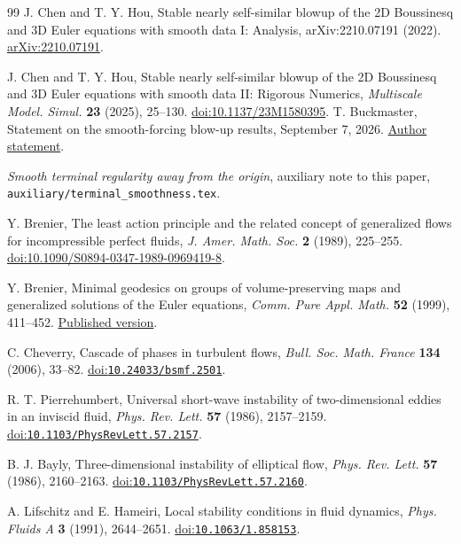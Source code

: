 \begin{thebibliography}{99}
 J. Chen and T. Y. Hou,
Stable nearly self-similar blowup of the 2D Boussinesq and 3D Euler
equations with smooth data I: Analysis,
arXiv:2210.07191 (2022).
\href{https://arxiv.org/abs/2210.07191v4}{arXiv:2210.07191}.

 J. Chen and T. Y. Hou,
Stable nearly self-similar blowup of the 2D Boussinesq and 3D Euler
equations with smooth data II: Rigorous Numerics,
\emph{Multiscale Model. Simul.} \textbf{23} (2025), 25--130.
\href{https://doi.org/10.1137/23M1580395}{doi:10.1137/23M1580395}.
 T. Buckmaster,
Statement on the smooth-forcing blow-up results, September 7, 2026.
\href{https://cims.nyu.edu/~tristanb/statement.pdf}{Author statement}.

\emph{Smooth terminal regularity away from the origin}, auxiliary note to
this paper, \nolinkurl{auxiliary/terminal_smoothness.tex}.

 Y. Brenier,
The least action principle and the related concept of generalized flows
for incompressible perfect fluids,
\emph{J. Amer. Math. Soc.} \textbf{2} (1989), 225--255.
\href{https://doi.org/10.1090/S0894-0347-1989-0969419-8}{doi:10.1090/S0894-0347-1989-0969419-8}.

 Y. Brenier,
Minimal geodesics on groups of volume-preserving maps and generalized
solutions of the Euler equations,
\emph{Comm. Pure Appl. Math.} \textbf{52} (1999), 411--452.
\href{https://doi.org/10.1002/(SICI)1097-0312(199904)52:4<411::AID-CPA1>3.0.CO;2-3}{Published version}.

 C. Cheverry,
Cascade of phases in turbulent flows,
\emph{Bull. Soc. Math. France} \textbf{134} (2006), 33--82.
\href{https://doi.org/10.24033/bsmf.2501}{doi:\nolinkurl{10.24033/bsmf.2501}}.

 R. T. Pierrehumbert,
Universal short-wave instability of two-dimensional eddies in an inviscid fluid,
\emph{Phys. Rev. Lett.} \textbf{57} (1986), 2157--2159.
\href{https://doi.org/10.1103/PhysRevLett.57.2157}{doi:\nolinkurl{10.1103/PhysRevLett.57.2157}}.

 B. J. Bayly,
Three-dimensional instability of elliptical flow,
\emph{Phys. Rev. Lett.} \textbf{57} (1986), 2160--2163.
\href{https://doi.org/10.1103/PhysRevLett.57.2160}{doi:\nolinkurl{10.1103/PhysRevLett.57.2160}}.

 A. Lifschitz and E. Hameiri,
Local stability conditions in fluid dynamics,
\emph{Phys. Fluids A} \textbf{3} (1991), 2644--2651.
\href{https://doi.org/10.1063/1.858153}{doi:\nolinkurl{10.1063/1.858153}}.


\end{thebibliography}
